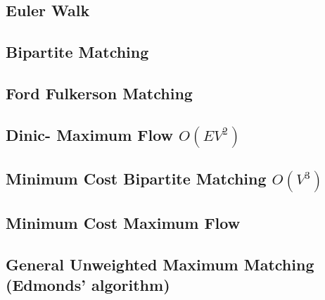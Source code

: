\documentclass[12pt]{extarticle}
\begin{document}
\begin{multicols*}{2}
\subsection{Euler Walk} %


\subsection{Bipartite Matching} %


\subsection{Ford Fulkerson Matching} %



\subsection{Dinic- Maximum Flow $O(EV^2)$ } %


\subsection{Minimum Cost Bipartite Matching $O(V^3)$ } %


\subsection{Minimum Cost Maximum Flow } %


\subsection{General Unweighted Maximum Matching (Edmonds' algorithm)}



\end{multicols*}
\end{document}
